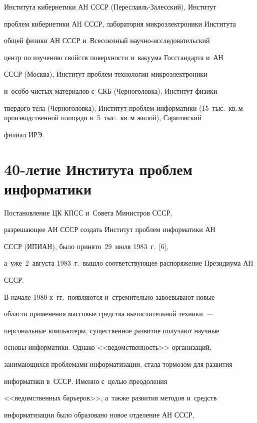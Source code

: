 Института кибернетики АН \mbox{СССР} (Пе\-ре\-славль-За\-лес\-ский), Институт 

проб\-лем кибернетики АН \mbox{СССР}, лаборатория микроэлектроники Института 

общей физики АН \mbox{СССР} и~Всесоюзный на\-уч\-но-ис\-сле\-до\-ва\-тель\-ский 

центр по изуче\-нию свойств по\-верх\-ности и~вакуума Госстандарта и~АН 

\mbox{СССР} (Москва), Институт проб\-лем технологии мик\-ро\-элект\-ро\-ни\-ки 

и~особо чис\-тых материалов с~СКБ (Черноголовка), Институт физики 

твер\-до\-го тела (Черноголовка), Институт проб\-лем информатики (15~тыс.~кв.\,м производственной площади и~5~тыс.~кв.\,м жилой), Саратовский 

филиал ИРЭ.

   

\section{40-летие Института проблем информатики}

   

   Постановление ЦК КПСС и~Совета Министров \mbox{СССР}, 

разрешающее АН СССР создать Институт проб\-лем информатики АН 

\mbox{СССР} (\mbox{ИПИАН}), было принято~29~июля 1983~г.~[6], 

а~уже~2~августа 1983~г.\ вы\-шло со\-от\-вет\-ст\-ву\-ющее распоряжение Президиума АН 

\mbox{СССР}. 

   

   В начале 1980-х~гг.\ появляются и~стремительно завоевывают новые 

области применения массовые средства вы\-чис\-ли\-тель\-ной техники~--- 

персональные компьютеры, существенное развитие получают научные 

осно\-вы информатики. Однако <<ве\-дом\-ст\-вен\-ность>> организаций, 

за\-ни\-ма\-ющих\-ся проб\-ле\-ма\-ми информатизации, стала тормозом для развития 

информатики в~\mbox{СССР}. Именно с~\mbox{целью} преодоления 

<<ведомственных барьеров>>, а~так\-же развития методов и~средств 

информатизации было образовано новое отделение АН \mbox{СССР},  

